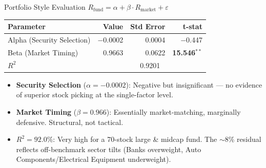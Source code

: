 \documentclass[11pt, aspectratio=43]{beamer}
\begin{document}
\begin{frame}{Portfolio Style Evaluation}
\centering
\small
$R_{\text{fund}} = \alpha + \beta \cdot R_{\text{market}} + \varepsilon$

\vspace{0.5em}

\begin{tabular}{l r r r}
\toprule
\textbf{Parameter} & \textbf{Value} & \textbf{Std Error} & \textbf{t-stat} \\
\midrule
Alpha (Security Selection) & $-$0.0002 & 0.0004 & $-$0.447 \\
Beta (Market Timing) & 0.9663 & 0.0622 & \textbf{15.546}$^{**}$ \\
$R^2$ & \multicolumn{3}{c}{0.9201} \\
\bottomrule
\end{tabular}

\vspace{0.8em}
\begin{itemize}
    \small
    \item \textbf{Security Selection} ($\alpha = -0.0002$): Negative but insignificant --- no evidence of superior stock picking at the single-factor level.
    \item \textbf{Market Timing} ($\beta = 0.966$): Essentially market-matching, marginally defensive. Structural, not tactical.
    \item \textbf{$R^2 = 92.0\%$}: Very high for a 70-stock large \& midcap fund. The $\sim$8\% residual reflects off-benchmark sector tilts (Banks overweight, Auto Components/Electrical Equipment underweight).
\end{itemize}
\end{frame}
\end{document}
